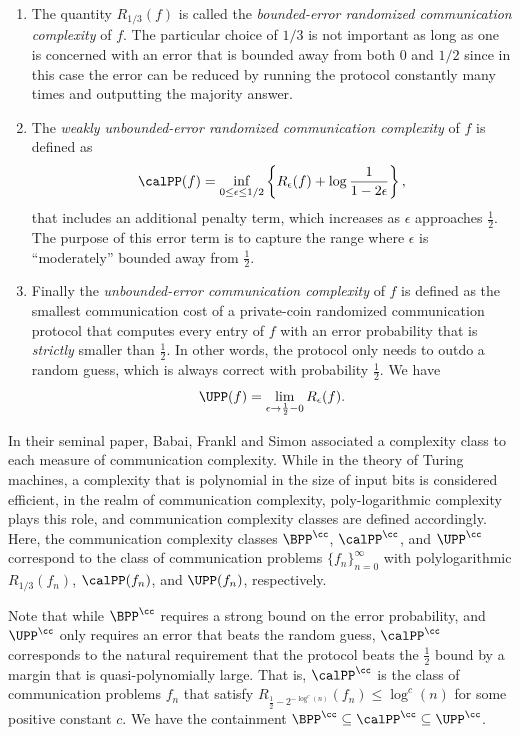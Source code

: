\begin{enumerate}
\item The quantity $R_{1/3}(f)$ is called the \emph{bounded-error  randomized communication complexity} of $f$.  The particular choice of $1/3$  is not important as long as one is concerned with an error that is bounded away from both $0$ and $1/2$ since in this case the error  can be reduced   by running the protocol constantly many times and outputting the majority answer.

\item The \emph{weakly unbounded-error  randomized communication complexity} of $f$ is defined as
$$\calPP(f) =  \inf_{0 \le \epsilon \le 1/2} \left\{R_\epsilon(f) +  \log  \frac{1}{1-2 \epsilon}  \right\}, $$
that includes an additional penalty term, which increases as $\epsilon$ approaches $\frac{1}{2}$. The purpose of this error term is to capture the range where $\epsilon$ is ``moderately'' bounded away from $\frac{1}{2}$.

\item Finally the \emph{unbounded-error communication complexity} of $f$ is defined as the smallest communication cost of a  private-coin randomized communication protocol that   computes every entry of $f$   with an error probability that is \emph{strictly} smaller than $\frac{1}{2}$. In other words,   the protocol only needs to  outdo a random guess, which is always correct with  probability $\frac{1}{2}$. We have
%
%
%
$$\UPP(f)=\lim_{\epsilon \to \frac{1}{2}-0} R_\epsilon(f).$$
%
\end{enumerate}

In their seminal paper, Babai, Frankl and Simon \cite{babai1986complexity} associated a   complexity class to each measure of communication complexity. While in the theory of Turing machines, a  complexity that is polynomial in the size of input bits is considered efficient, in the realm of communication complexity, poly-logarithmic complexity plays this role, and communication complexity classes are defined accordingly.  Here, the communication complexity classes $\BPP^\cc$, $\calPP^\cc$, and  $\UPP^\cc$  correspond to the class of communication problems $\{f_n\}_{n=0}^\infty$ with  polylogarithmic  $R_{1/3}(f_n)$, $\calPP(f_n)$, and $\UPP(f_n)$, respectively.

Note that while $\BPP^\cc$ requires a strong bound on the error probability, and $\UPP^\cc$ only requires an error that beats  the random guess, $\calPP^\cc$  corresponds to the natural requirement that the  protocol  beats the $\frac{1}{2}$ bound by a margin that is quasi-polynomially large.  That is, $\calPP^\cc$  is  the class of communication problems $f_n$ that satisfy $R_{\frac{1}{2}-2^{-\log^c(n)}}(f_n) \le \log^c(n)$ for some positive constant $c$.  We have the containment $\BPP^\cc \subseteq \calPP^\cc \subseteq \UPP^\cc$.

